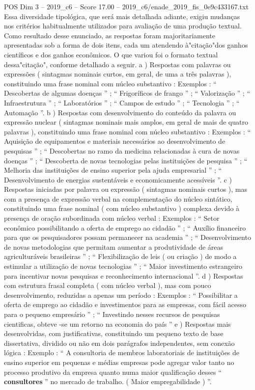 \begin{textsample}{POS Dim 3 – 2019\_c6 – Score 17.00 – 2019\_c6/enade\_2019\_fis\_0e9c433167.txt}
Essa diversidade tipológica, que será mais detalhada adiante, exigiu mudanças nos critérios habitualmente utilizados para avaliação de uma produção textual.
Como resultado desse enunciado, as respostas foram majoritariamente apresentadas sob a forma de dois itens, cada um atendendo à"citação"dos ganhos científicos e dos ganhos econômicos.
O que variou foi o formato textual dessa"citação", conforme detalhado a seguir. a ) Respostas com palavras ou expressões ( sintagmas nominais curtos, em geral, de uma a três palavras ), constituindo uma frase nominal com núcleo substantivo : Exemplos : “ Descobertas de algumas doenças ” ; “ Frigoríficos de frango ” ; “ Valorização ” ; “ Infraestrutura ” ; “ Laboratórios ” ; “ Campos de estudo ” ; “ Tecnologia ” ; “ Automação ”. b ) Respostas com desenvolvimento do conteúdo da palavra ou expressão nuclear ( sintagmas nominais mais amplos, em geral de mais de quatro palavras ), constituindo uma frase nominal com núcleo substantivo : Exemplos : “ Aquisição de equipamentos e materiais necessários ao desenvolvimento de pesquisas ” ; “ Descobertas no ramo da medicina relacionadas à cura de novas doenças ” ; “ Descoberta de novas tecnologias pelas instituições de pesquisa ” ; “ Melhoria das instituições de ensino superior pela ajuda empresarial ” ; “ Desenvolvimento de energias sustentáveis e economicamente acessíveis ”. c ) Respostas iniciadas por palavra ou expressão ( sintagmas nominais curtos ), mas com a presença de expressão verbal na complementação do núcleo sintático, constituindo uma frase nominal ( com núcleo substantivo ) complexa devido à presença de oração subordinada com núcleo verbal : Exemplos : “ Setor econômico possibilitando a oferta de emprego ao cidadão ” ; “ Auxílio financeiro para que os pesquisadores possam permanecer na academia ” ; “ Desenvolvimento de novas metodologias que permitam aumentar a produtividade de áreas agriculturáveis brasileiras ” ; “ Flexibilização de leis ( ou criação ) de modo a estimular a utilização de novas tecnologias ” ; “ Maior investimento estrangeiro para incentivar novas pesquisas e reconhecimento internacional ”. d ) Respostas com estrutura frasal completa ( com núcleo verbal ), mas com pouco desenvolvimento, reduzidas a apenas um período : Exemplos : “ Possibilitar a oferta de emprego ao cidadão e investimentos para as empresas, com fácil acesso para o pequeno empresário ” ; “ Investindo nesses recursos de pesquisas cientificas, obteve -se um retorno na economia do país ” e ) Respostas mais desenvolvidas, com justificativas, constituindo um pequeno texto de base dissertativa, dividido ou não em dois parágrafos independentes, sem conexão lógica : Exemplo : “ A consultoria de membros laboratoriais de instituições de ensino superior em pequenas e médias empresas pode agregar valor tanto no processo produtivo da empresa quanto numa maior qualificação desses “ \textbf{consultores} ” no mercado de trabalho. ( Maior empregabilidade ) ”.

\end{textsample}
